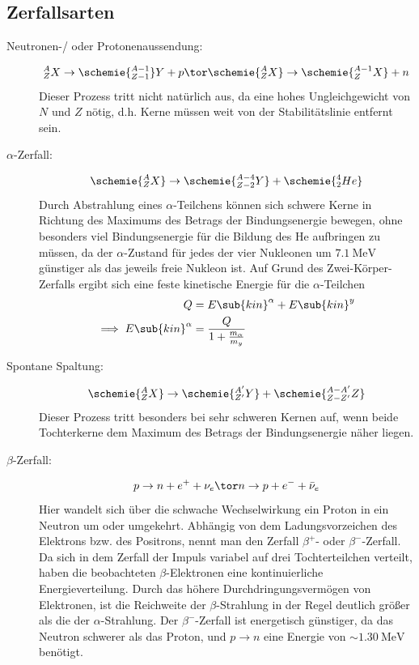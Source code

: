 \documentclass[twocolumn]{summery_4.1}
\begin{document}
\subsection{Zerfallsarten}
\begin{description}
    \item[Neutronen-/ oder Protonenaussendung:] 
    \begin{align*}
        {}_Z^A X \to \schemie{_{Z-1}^{A-1}} Y + p \tor \schemie{_Z^AX} \to \schemie{_Z^{A-1}X} + n 
    \end{align*} 
    Dieser Prozess tritt nicht natürlich aus, da eine hohes Ungleichgewicht von \(N\) und \(Z\) nötig, d.h. Kerne müssen weit von der Stabilitätslinie entfernt sein.

    \item[\(\alpha\)-Zerfall:] 
    \begin{align*}
        \schemie{_Z^A X} \to \schemie{_{Z-2}^{A-4}Y} + \schemie{_2^4 He}
    \end{align*}
    Durch Abstrahlung eines $\alpha$-Teilchens können sich schwere Kerne in Richtung des Maximums des Betrags der Bindungsenergie bewegen, ohne besonders viel Bindungsenergie für die Bildung des He aufbringen
    zu müssen, da der $\alpha$-Zustand für jedes der vier Nukleonen um $\SI{7.1}\MeV$ günstiger als das jeweils freie Nukleon ist.
    Auf Grund des Zwei-Körper-Zerfalls ergibt sich eine feste kinetische Energie für die \(\alpha\)-Teilchen 
    \begin{align*}
        Q &=E\sub{kin}^\alpha + E\sub{kin}^y \\
        \implies E\sub{kin}^\alpha &= \frac{Q}{1 + \frac{m_\alpha}{m_y}}
    \end{align*}
    
    \item[Spontane Spaltung:] 
    \begin{align*}
        \schemie{_Z^A X} \to \schemie{_{Z'}^{A'} Y} + \schemie{_{Z-Z'}^{A-A'} Z}
    \end{align*} Dieser Prozess tritt besonders bei sehr schweren Kernen auf, wenn beide Tochterkerne dem Maximum des Betrags der Bindungsenergie näher liegen.

    \item[\(\beta\)-Zerfall:]
    \begin{align*}
        p\to n+e^+ + \nu_e  \tor n\to p+e^- + \bar \nu_e
    \end{align*}
    Hier wandelt sich über die schwache Wechselwirkung ein Proton in ein Neutron um oder umgekehrt. Abhängig von dem Ladungsvorzeichen des Elektrons bzw. des Positrons, nennt man den Zerfall $\beta^+$- oder $\beta^-$-Zerfall. Da sich in dem Zerfall der Impuls variabel auf drei Tochterteilchen verteilt, haben die beobachteten
    \(\beta\)-Elektronen eine kontinuierliche Energieverteilung. Durch das höhere Durchdringungsvermögen von Elektronen, ist die Reichweite der \(\beta\)-Strahlung in der Regel deutlich größer als die der $\alpha$-Strahlung. Der \(\beta^-\)-Zerfall ist energetisch günstiger, da das Neutron schwerer als das Proton, und \(p\to n\) eine Energie von \(\sim \SI{1.30}{\MeV}\) benötigt. 


\end{description}
\end{document}

